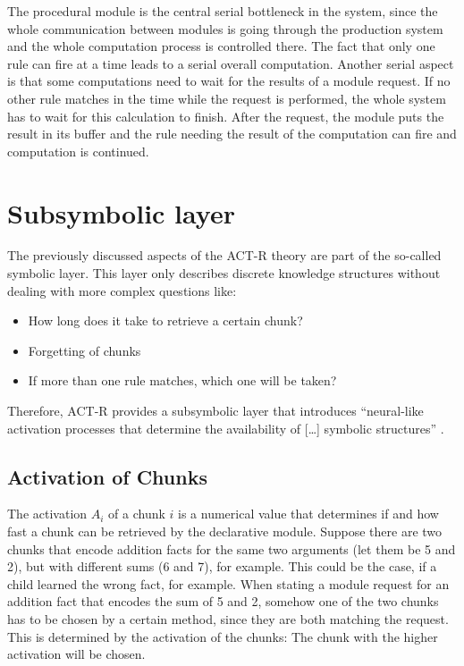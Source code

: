 The procedural module is the central serial bottleneck in the system, since the whole communication between modules is going through the production system and the whole computation process is controlled there. The fact that only one rule can fire at a time leads to a serial overall computation. Another serial aspect is that some computations need to wait for the results of a module request. If no other rule matches in the time while the request is performed, the whole system has to wait for this calculation to finish. After the request, the module puts the result in its buffer and the rule needing the result of the computation can fire and computation is continued.

\section{Subsymbolic layer}

The previously discussed aspects of the ACT-R theory are part of the so-called symbolic layer. This layer only describes discrete knowledge structures without dealing with more complex questions like: 

\begin{itemize}
\item How long does it take to retrieve a certain chunk? 
\item Forgetting of chunks
\item If more than one rule matches, which one will be taken?
\end{itemize}

Therefore, ACT-R provides a subsymbolic layer that introduces ``neural-like activation processes that determine the availability of [\dots] symbolic structures'' \cite{anderson_implications_2000}.

\subsection{Activation of Chunks}
\label{activation}

The activation $A_i$ of a chunk $i$ is a numerical value that determines if and how fast a chunk can be retrieved by the declarative module. Suppose there are two chunks that encode addition facts for the same two arguments (let them be 5 and 2), but with different sums (6 and 7), for example. This could be the case, if a child learned the wrong fact, for example. When stating a module request for an addition fact that encodes the sum of 5 and 2, somehow one of the two chunks has to be chosen by a certain method, since they are both matching the request. This is determined by the activation of the chunks: The chunk with the higher activation will be chosen.

